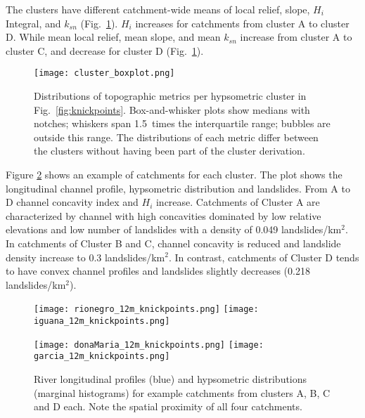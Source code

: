 \documentclass[draft]{agujournal2019}
\begin{document}
\par The clusters have different catchment-wide means of local relief, slope, $H_i$ Integral, and $k_{sn}$ (Fig.~\ref{fig:cluster2}). $H_i$ increases for catchments from cluster A to cluster D.  While mean local relief, mean slope, and mean $k_{sn}$ increase from cluster A to cluster C, and decrease for cluster D (Fig.~\ref{fig:cluster2}).

\begin{figure}[ht!]
     \centering
        {\texttt{[image: cluster\_boxplot.png]}}
    \caption{Distributions of topographic metrics per hypsometric cluster in Fig.~\ref{fig:knickpoints}. Box-and-whisker plots show medians with notches; whiskers span 1.5~times the interquartile range; bubbles are outside this range. The distributions of each metric differ between the clusters without having been part of the cluster derivation.}
  \label{fig:cluster2}
\end{figure}

\par Figure \ref{fig:cluster-profile} shows an example of catchments for each cluster. The plot shows the longitudinal channel profile, hypsometric distribution and landslides. From A to D channel concavity index and $H_i$ increase. Catchments of Cluster A are characterized by channel with high concavities dominated by low relative elevations and low number of landslides with a density of 0.049 landslides/km$^2$. In catchments of Cluster B and C, channel concavity is reduced and landslide density increase to 0.3 landslides/km$^2$. In contrast, catchments of Cluster D tends to have convex channel profiles and landslides slightly decreases (0.218 landslides/km$^2$).

\begin{figure}[ht!]
  \begin{minipage}{.48\linewidth}
    \centering
      {\texttt{[image: rionegro\_12m\_knickpoints.png]}}
      {\texttt{[image: iguana\_12m\_knickpoints.png]}}
  \end{minipage}\quad
  \begin{minipage}{.48\linewidth}
    \centering
      {\texttt{[image: donaMaria\_12m\_knickpoints.png]}}
      {\texttt{[image: garcia\_12m\_knickpoints.png]}}
  \end{minipage}
    \caption{River longitudinal profiles (blue) and hypsometric distributions (marginal histograms) for example catchments from clusters A, B, C and D each. Note the spatial proximity of all four catchments.}
    \label{fig:cluster-profile}
\end{figure}
\end{document}
